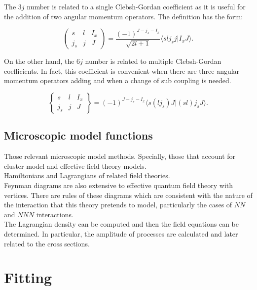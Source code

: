 \documentclass[openany]{book}
\begin{document}
The $3j$ number is related to a single Clebsh-Gordan coefficient as it is useful for the addition of two angular momentum operators. The definition has the form: 

\begin{equation} \label{eq:angularMomentum_Wigner_3j}
	\left(\begin{array}{ccc}
		s &	l &	I_x \\
		j_s & j & J
	\end{array}\right) = \frac{(-1)^{J - j_s - I_x}}{\sqrt{2l +1}}  \langle sl j_s j | I_x J \rangle.
\end{equation}

On the other hand, the $6j$ number is related to multiple  Clebsh-Gordan coefficients. In fact, this coefficient is convenient when there are three angular momentum operators adding and when a change of sub coupling is needed.

\begin{equation}  \label{eq:angularMomentum_Wigner_6j}
	\left\{\begin{array}{ccc}
		s &	l &	I_x \\
		j_s & j & J
	\end{array}\right\} = (-1)^{J - j_s - I_x}  \langle s (l j_s) J | (s l) j_s J\rangle.
\end{equation}

\section{Microscopic model functions} \label{sec:microscopicalFunctions}

Those relevant microscopic model methods. Specially, those that account for cluster model and effective field theory models. \\

Hamiltonians and Lagrangians of related field theories. \\

Feynman diagrams are also extensive to effective quantum field theory with vertices. There are rules of these diagrams which are consistent with the nature of the interaction that this theory pretends to model, particularly the cases of $NN$ and $NNN$ interactions. \\

The Lagrangian density can be computed and then the field equations can be determined. In particular, the amplitude of processes are calculated and later related to the cross sections. 

\chapter{Fitting} \label{ap:fitting}
\end{document}
